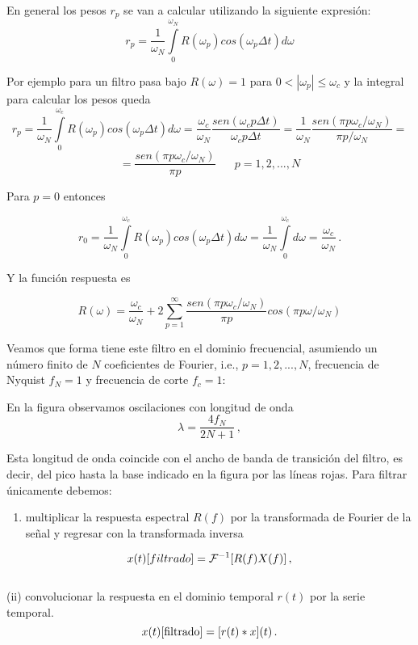 \documentclass[
]{agujournal2019}
\providecommand{\tightlist}{%
  \setlength{\itemsep}{0pt}\setlength{\parskip}{0pt}}\usepackage{longtable,booktabs,array}
\begin{document}
En general los pesos \(r_p\) se van a calcular utilizando la siguiente
expresión:
\[r_p=\frac{1}{\omega_N}\int\limits^{\omega_N}_0 R(\omega_p) cos(\omega_p \Delta t
)d{\omega}\]

Por ejemplo para un filtro pasa bajo \(R(\omega)=1\) para
\(0<|\omega_p|\le \omega_c\) y la integral para calcular los pesos queda
\[r_p=\frac{1}{\omega_N}\int\limits^{\omega_c}_0 R(\omega_p) cos(\omega_p \Delta t
)d{\omega}=\frac{\omega_c}{\omega_N}\frac{sen(\omega_c p \Delta t)}{\omega_c p \Delta t}=
      \frac{1}{\omega_N}\frac{sen(\pi p \omega_c / \omega_N)}{\pi p / \omega_N}=\]
\[=\frac{sen(\pi p \omega_c / \omega_N)}{\pi p}\,\,\,\,\,\,\,\,\,\,p=1,2,...,N\]

Para \(p=0\) entonces

\[r_0=\frac{1}{\omega_N}\int\limits^{\omega_c}_0 R(\omega_p) cos(\omega_p \Delta t
)d{\omega}=\frac{1}{\omega_N}\int\limits^{\omega_c}_0 d{\omega}=\frac{\omega_c}{\omega_N}\,.\]

Y la función respuesta es

\[R(\omega)=\frac{\omega_c}{\omega_N} + 2\sum\limits^{\infty}_{p=1}
\frac{sen(\pi p \omega_c / \omega_N)}{\pi p}cos(\pi p \omega / \omega_N)\]

Veamos que forma tiene este filtro en el dominio frecuencial, asumiendo
un número finito de \(N\) coeficientes de Fourier, i.e.,
\(p=1,2,...,N\), frecuencia de Nyquist \(f_N=1\) y frecuencia de corte
\(f_c=1\):

\begin{center}
\end{center}

En la figura observamos oscilaciones con longitud de onda
\[\lambda=\frac{4f_N}{2N+1}\,,\]

Esta longitud de onda coincide con el ancho de banda de transición del
filtro, es decir, del pico hasta la base indicado en la figura por las
líneas rojas. Para filtrar únicamente debemos: ~

\begin{enumerate}
\def\labelenumi{(\roman{enumi})}
\tightlist
\item
  multiplicar la respuesta espectral \(R(f)\) por la transformada de
  Fourier de la señal y regresar con la transformada inversa
\end{enumerate}

\[x(t)[filtrado]={\cal F}^{-1}[R(f)X(f)]\,,\]\\
(ii) convolucionar la respuesta en el dominio temporal \(r(t)\) por la
serie temporal. \[x(t)[{\rm filtrado}]=[r(t)*x](t)\,.\]\\
\end{document}

